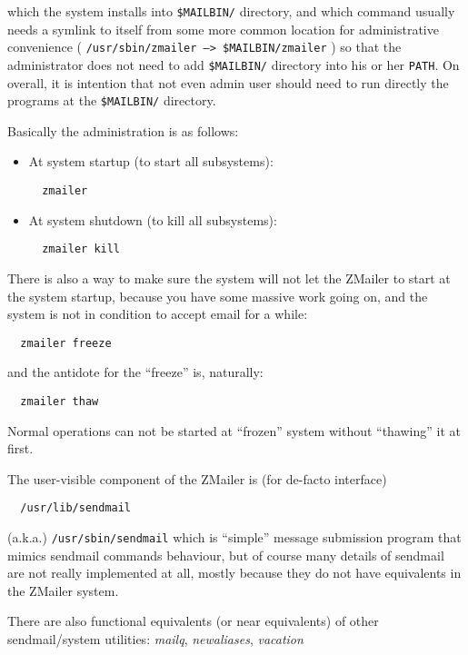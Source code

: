which the system installs into {\tt \$MAILBIN/} directory, and which command usually needs a symlink to itself from some more common location for
administrative convenience
( {\tt /usr/sbin/zmailer --> \$MAILBIN/zmailer} )
so that the administrator does not need to add  {\tt \$MAILBIN/}  directory
into his or her {\tt PATH}.   On overall, it is intention that not even 
admin
user should need to run directly the programs at the {\tt \$MAILBIN/} directory.

Basically the administration is as follows:
\begin{itemize}
\item At system startup (to start all subsystems):
\begin{verbatim}
  zmailer
\end{verbatim}
\item At system shutdown (to kill all subsystems):
\begin{verbatim}
  zmailer kill
\end{verbatim}
\end{itemize}

There is also a way to make sure the system will not let the ZMailer
to start at the system startup, because you have some massive work
going on, and the system is not in condition to accept email for a while: 
\begin{verbatim}
  zmailer freeze
\end{verbatim}

and the antidote for the ``freeze'' is, naturally:
\begin{verbatim}
  zmailer thaw
\end{verbatim}

Normal operations can not be started at ``frozen'' system without ``thawing'' it at first.

The user-visible component of the ZMailer is (for de-facto interface)
\begin{verbatim}
  /usr/lib/sendmail
\end{verbatim}

(a.k.a.) {\tt /usr/sbin/sendmail}
which is ``simple'' message submission program that mimics sendmail
commands behaviour, but of course many details of sendmail are
not really implemented at all, mostly because they do not have
equivalents in the ZMailer system.

There are also functional equivalents (or near equivalents) of
other sendmail/system utilities:  {\em mailq\/}, {\em newaliases\/}, {\em vacation\/}




